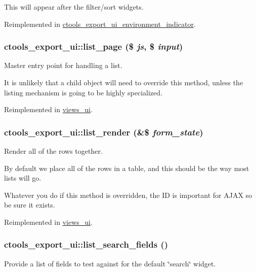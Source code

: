 This will appear after the filter/sort widgets. 

Reimplemented in \hyperlink{classctools__export__ui__environment__indicator_a59040bf692c3ed762acc456af90ecdfb}{ctools\_\-export\_\-ui\_\-environment\_\-indicator}.\hypertarget{classctools__export__ui_af0783238d93c1d94fdd86cf9d2f24d21}{
\subsubsection[{list\_\-page}]{\setlength{\rightskip}{0pt plus 5cm}ctools\_\-export\_\-ui::list\_\-page (\$ {\em js}, \/  \$ {\em input})}}
\label{classctools__export__ui_af0783238d93c1d94fdd86cf9d2f24d21}
Master entry point for handling a list.

It is unlikely that a child object will need to override this method, unless the listing mechanism is going to be highly specialized. 

Reimplemented in \hyperlink{classviews__ui_a4f606da1d97a8f4cfa6c42bdad0ccaa1}{views\_\-ui}.\hypertarget{classctools__export__ui_aa9f27b96c434495b0d56abf6cdc72346}{
\subsubsection[{list\_\-render}]{\setlength{\rightskip}{0pt plus 5cm}ctools\_\-export\_\-ui::list\_\-render (\&\$ {\em form\_\-state})}}
\label{classctools__export__ui_aa9f27b96c434495b0d56abf6cdc72346}
Render all of the rows together.

By default we place all of the rows in a table, and this should be the way most lists will go.

Whatever you do if this method is overridden, the ID is important for AJAX so be sure it exists. 

Reimplemented in \hyperlink{classviews__ui_a51cb7760695677e83c5f9635a76c3211}{views\_\-ui}.\hypertarget{classctools__export__ui_a6f977dc0c413c1b4a02e0846d9416598}{
\subsubsection[{list\_\-search\_\-fields}]{\setlength{\rightskip}{0pt plus 5cm}ctools\_\-export\_\-ui::list\_\-search\_\-fields ()}}
\label{classctools__export__ui_a6f977dc0c413c1b4a02e0846d9416598}
Provide a list of fields to test against for the default \char`\"{}search\char`\"{} widget.


